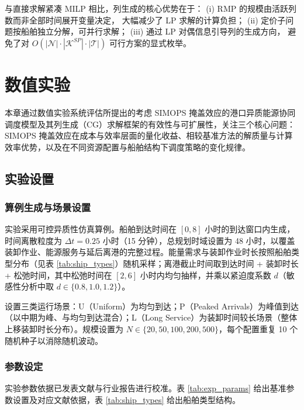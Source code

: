 \documentclass[UTF8, a4paper, 12pt]{ctexart}
\theoremstyle{plain}
\theoremstyle{definition}
\theoremstyle{remark}
\begin{document}
\noindent
与直接求解紧凑 MILP 相比，列生成的核心优势在于：
(i) RMP 的规模由活跃列数而非全部时间展开变量决定，
大幅减少了 LP 求解的计算负担；
(ii) 定价子问题按船舶独立分解，可并行求解；
(iii) 通过 LP 对偶信息引导列的生成方向，
避免了对 $O(|\mathcal{N}| \cdot |\mathcal{K}^{SP}| \cdot |\mathcal{T}|)$
可行方案的显式枚举。



\section{数值实验}
\label{sec:computational}

本章通过数值实验系统评估所提出的考虑 SIMOPS 掩盖效应的港口异质能源协同调度模型及其列生成（CG）求解框架的有效性与可扩展性，关注三个核心问题：SIMOPS 掩盖效应在成本与效率层面的量化收益、相较基准方法的解质量与计算效率优势，以及在不同资源配置与船舶结构下调度策略的变化规律。

\subsection{实验设置}
\label{sec:exp_setup}

\subsubsection{算例生成与场景设置}
\label{sec:data_instances}
实验采用可控异质性仿真算例。船舶到达时间在 $[0,8]$ 小时的到达窗口内生成，时间离散粒度为 $\Delta t=0.25$ 小时（15 分钟），总规划时域设置为 48 小时，以覆盖装卸作业、能源服务与延后离港的完整过程。能量需求与装卸作业时长按照船舶类型分布（见表 \ref{tab:ship_types}）随机采样；离港截止时间取到达时间 + 装卸时长 + 松弛时间，其中松弛时间在 $[2,6]$ 小时内均匀抽样，并乘以紧迫度系数 $d$（敏感性分析中取 $d\in\{0.8,1.0,1.2\}$）。

设置三类运行场景：U（Uniform）为均匀到达；P（Peaked Arrivals）为峰值到达（以中期为峰、与均匀到达混合）；L（Long Service）为装卸时间较长场景（整体上移装卸时长分布）。规模设置为 $N\in\{20,50,100,200,500\}$，每个配置重复 10 个随机种子以消除随机波动。

\subsubsection{参数设定}
\label{sec:parameter_setting}

实验参数依据已发表文献与行业报告进行校准。表 \ref{tab:exp_params} 给出基准参数设置及对应文献依据，表 \ref{tab:ship_types} 给出船舶类型结构。
\end{document}
